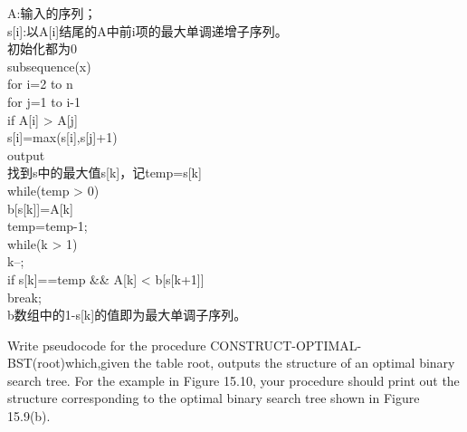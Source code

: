 \documentclass[a4paper, justified]{tufte-handout}
\begin{document}
\begin{solution}
A:输入的序列；\\
s[i]:以A[i]结尾的A中前i项的最大单调递增子序列。\\
初始化都为0\\
subsequence(x)\\
\hspace*{0.6 cm} for i=2 to n\\
\hspace*{1.2 cm}     for j=1 to i-1\\
\hspace*{1.8 cm}        if A[i] > A[j]\\
\hspace*{2.4 cm}            s[i]=max(s[i],s[j]+1)\\
output\\
\hspace*{0.6 cm} 找到s中的最大值s[k]，记temp=s[k]\\
\hspace*{0.6 cm} while(temp > 0)\\
\hspace*{1.2 cm}    b[s[k]]=A[k]\\
\hspace*{1.2 cm}    temp=temp-1;\\
\hspace*{1.2 cm}    while(k > 1)\\
\hspace*{1.8 cm}        k--;\\
\hspace*{1.8 cm}        if s[k]==temp \&\& A[k] < b[s[k+1]]\\
\hspace*{2.4 cm}               break;\\
b数组中的1-s[k]的值即为最大单调子序列。
\end{solution}

\begin{problem}[TC 15.5-1]
Write  pseudocode  for  the  procedure  CONSTRUCT-OPTIMAL-BST(root)which,given the table root, outputs the structure of an optimal binary search tree. For the example in Figure 15.10, your procedure should print out the structure corresponding to the optimal binary search tree shown in Figure 15.9(b). \\

\end{problem}
\end{document}
